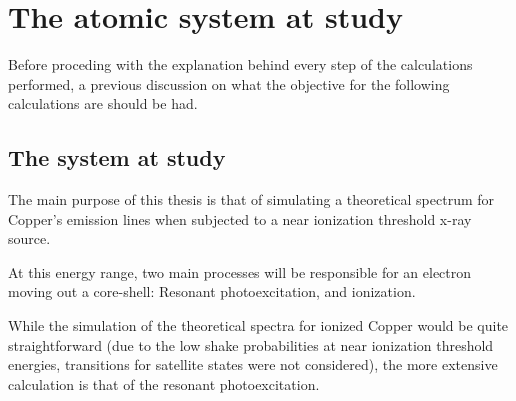 % 
%  


\section{The atomic system at study}

Before proceding with the explanation behind every step of the calculations performed, a previous discussion on what the objective for the following calculations are should be had.
\subsection{The system at study}

The main purpose of this thesis is that of simulating a theoretical spectrum for Copper's emission lines when subjected to a near ionization threshold x-ray source.

At this energy range, two main processes will be responsible for an electron moving out a core-shell: Resonant photoexcitation, and ionization.

While the simulation of the theoretical spectra for ionized Copper would be quite straightforward (due to the low shake probabilities at near ionization threshold energies, transitions for satellite states were not considered), the more extensive calculation is that of the resonant photoexcitation.

